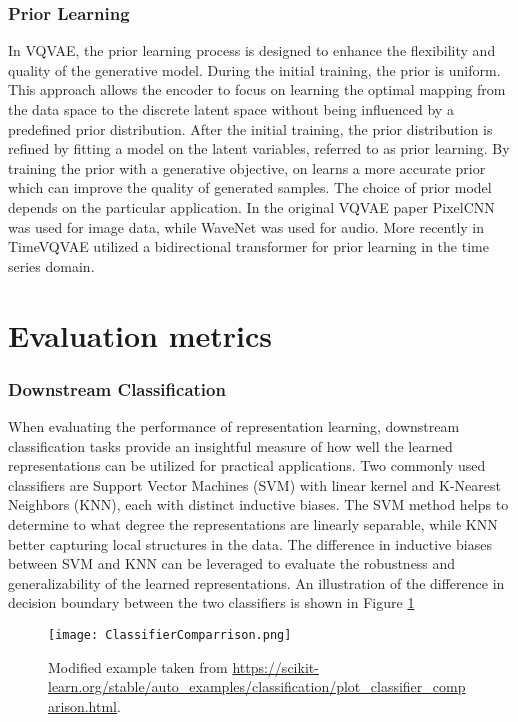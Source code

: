 \documentclass[../../thesis.tex]{subfiles}
\begin{document}
\subsubsection{Prior Learning}
In VQVAE, the prior learning process is designed to enhance the flexibility and quality of the generative model. During the initial training, the prior is uniform. This approach allows the encoder to focus on learning the optimal mapping from the data space to the discrete latent space without being influenced by a predefined prior distribution. After the initial training, the prior distribution is refined by fitting a model on the latent variables, referred to as prior learning. By training the prior with a generative objective, on learns a more accurate prior which can improve the quality of generated samples. The choice of prior model depends on the particular application. In the original VQVAE paper PixelCNN \cite{oord2016pixel} was used for image data, while WaveNet \cite{oord2016wavenet} was used for audio. More recently in TimeVQVAE \cite{TimeVQVAE} utilized a bidirectional transformer \cite{chang2022maskgit} for prior learning in the time series domain. 

\section{Evaluation metrics}

\subsubsection{Downstream Classification}

When evaluating the performance of representation learning, downstream classification tasks provide an insightful measure of how well the learned representations can be utilized for practical applications. Two commonly used classifiers are Support Vector Machines (SVM) with linear kernel and K-Nearest Neighbors (KNN), each with distinct inductive biases. The SVM method helps to determine to what degree the representations are linearly separable, while KNN better capturing local structures in the data. The difference in inductive biases between SVM and KNN can be leveraged to evaluate the robustness and generalizability of the learned representations. An illustration of the difference in decision boundary between the two classifiers is shown in Figure \ref{fig:ClassifierComparrison}

\begin{figure}[h]
    \texttt{[image: ClassifierComparrison.png]}
    \centering
    \caption{Modified example taken from \url{https://scikit-learn.org/stable/auto_examples/classification/plot_classifier_comparison.html}.}
    \label{fig:ClassifierComparrison}
\end{figure}
\end{document}
